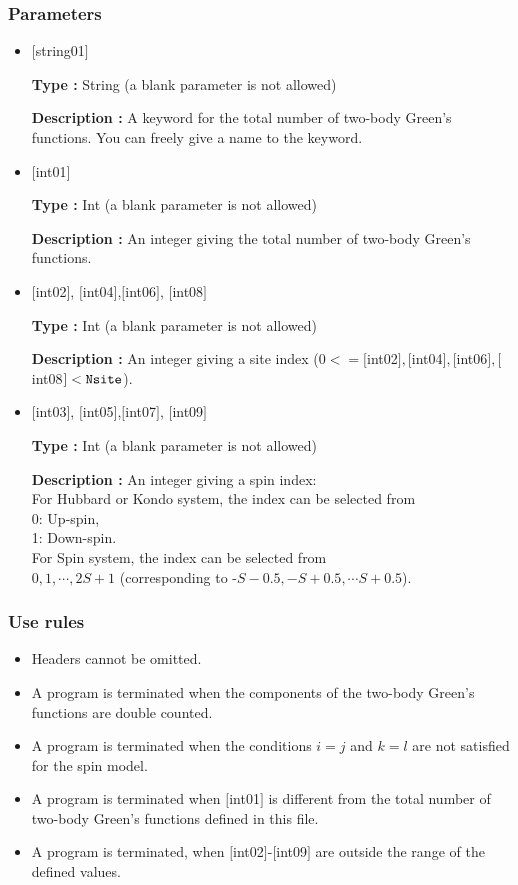 \subsubsection{Parameters}
 \begin{itemize}
    \item  $[$string01$]$
   
    {\bf Type :} String (a blank parameter is not allowed)

   {\bf Description :} A keyword for the total number of two-body Green's functions. You can freely give a name to the keyword.

   \item  $[$int01$]$
   
    {\bf Type :} Int (a blank parameter is not allowed)

   {\bf Description :}  An integer giving the total number of two-body Green's functions.


  \item  $[$int02$]$, $[$int04$]$,$[$int06$]$, $[$int08$]$

 {\bf Type :} Int (a blank parameter is not allowed)

{\bf Description :} An integer giving a site index ($0<= [$int02$], [$int04$], [$int06$], [$int08$]<\verb|Nsite|$).
 
  \item  $[$int03$]$, $[$int05$]$,$[$int07$]$, $[$int09$]$

 {\bf Type :} Int (a blank parameter is not allowed)

{\bf Description :} 
An integer giving a spin index:\\
For Hubbard or Kondo system, the index can be selected from\\
0: Up-spin,\\
1: Down-spin.\\
For Spin system, the index can be selected from\\
$0, 1, \cdots, 2S+1$ (corresponding to -$S-0.5, -S+0.5, \cdots S+0.5$).

\end{itemize}

\subsubsection{Use rules}
\begin{itemize}
\item Headers cannot be omitted. 
\item A program is terminated when the components of the two-body Green's functions are double counted.
\item {A program is terminated when the conditions $i=j$ and $k=l$ are not satisfied for the spin model.}
\item A program is terminated when $[$int01$]$ is different from the total number of two-body Green's functions defined in this file.
\item A program is terminated, when $[$int02$]$-$[$int09$]$ are outside the range of the defined values.
\end{itemize}

